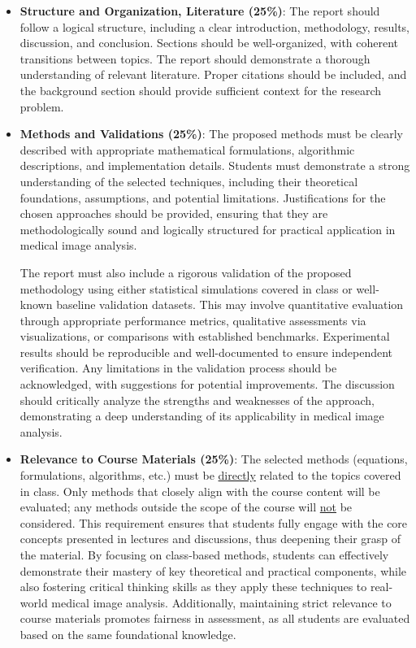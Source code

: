 \documentclass[12pt,portrait]{article}
\begin{document}
\begin{itemize}
    \item \textbf{Structure and Organization, Literature  (25\%)}: The report should follow a logical structure, including a clear introduction, methodology, results, discussion, and conclusion. Sections should be well-organized, with coherent transitions between topics.  The report should demonstrate a thorough understanding of relevant literature. Proper citations should be included, and the background section should provide sufficient context for the research problem.
    

\item \textbf{Methods and Validations (25\%)}: The proposed methods must be clearly described with appropriate mathematical formulations, algorithmic descriptions, and implementation details. Students must demonstrate a strong understanding of the selected techniques, including their theoretical foundations, assumptions, and potential limitations. Justifications for the chosen approaches should be provided, ensuring that they are methodologically sound and logically structured for practical application in medical image analysis. 

The report must also include a rigorous validation of the proposed methodology using either statistical simulations covered in class or well-known baseline validation datasets. This may involve quantitative evaluation through appropriate performance metrics, qualitative assessments via visualizations, or comparisons with established benchmarks. Experimental results should be reproducible and well-documented to ensure independent verification. Any limitations in the validation process should be acknowledged, with suggestions for potential improvements. The discussion should critically analyze the strengths and weaknesses of the approach, demonstrating a deep understanding of its applicability in medical image analysis.


\item \textbf{Relevance to Course Materials (25\%)}: The selected methods (equations, formulations, algorithms, etc.) must be \underline{directly} related to the topics covered in class. Only methods that closely align with the course content will be evaluated; any methods outside the scope of the course will \underline{not} be considered. This requirement ensures that students fully engage with the core concepts presented in lectures and discussions, thus deepening their grasp of the material. By focusing on class-based methods, students can effectively demonstrate their mastery of key theoretical and practical components, while also fostering critical thinking skills as they apply these techniques to real-world medical image analysis. Additionally, maintaining strict relevance to course materials promotes fairness in assessment, as all students are evaluated based on the same foundational knowledge. 



\end{itemize}
\end{document}
